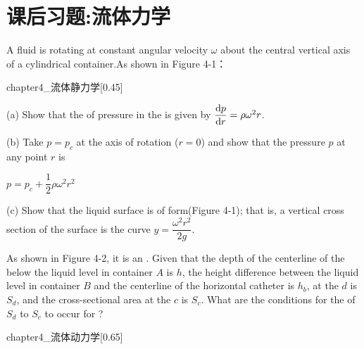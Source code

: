 \section{课后习题:流体力学}
	\begin{example}
		A fluid is rotating at constant angular velocity $\omega$ about the central vertical axis of a cylindrical container.As shown in Figure 4-1：
		\begin{singlefigure}[流体静力学]{chapter4_流体静力学}[0.45]
		\end{singlefigure}
		
		(a) Show that the  of pressure in the  is given by $\dfrac{\dif p}{\dif r}=\rho \omega^2 r$.
		
		(b) Take $p=p_c$ at the axis of rotation ($r=0$) and show that the pressure $p$ at any point $r$ is
		\begin{center}
			$p=p_c+\dfrac{1}{2}\rho\omega^2 r^2$
		\end{center}

		(c) Show that the liquid surface is of  form(Figure 4-1); that is, a vertical cross section of the surface is the curve $y=\dfrac{\omega^2 r^2}{2g}$.
	\end{example}
	\begin{example}
		As shown in Figure 4-2, it is an . Given that the depth of the centerline of the  below the liquid level in container $A$ is $h$, 
		the height difference between the liquid level in container $B$ and the centerline of the horizontal catheter is $h_b$,  at the  $d$ is $S_d$, 
		and the cross-sectional area at the  $c$ is $S_c$. What are the conditions for the  of $S_d$ to $S_c$ to occur for ?
		\begin{singlefigure}[流体动力学]{chapter4_流体动力学}[0.65]
		\end{singlefigure}
	\end{example}